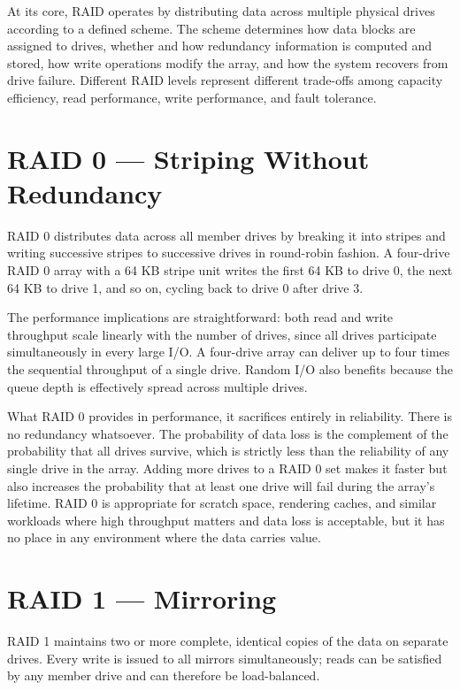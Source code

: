 At its core, RAID operates by distributing data across multiple physical drives according to a defined scheme. The scheme determines how data blocks are assigned to drives, whether and how redundancy information is computed and stored, how write operations modify the array, and how the system recovers from drive failure. Different RAID levels represent different trade-offs among capacity efficiency, read performance, write performance, and fault tolerance.

\section{RAID 0 --- Striping Without Redundancy}
RAID 0 distributes data across all member drives by breaking it into stripes and writing successive stripes to successive drives in round-robin fashion. A four-drive RAID 0 array with a 64 KB stripe unit writes the first 64 KB to drive 0, the next 64 KB to drive 1, and so on, cycling back to drive 0 after drive 3.

The performance implications are straightforward: both read and write throughput scale linearly with the number of drives, since all drives participate simultaneously in every large I/O. A four-drive array can deliver up to four times the sequential throughput of a single drive. Random I/O also benefits because the queue depth is effectively spread across multiple drives.

What RAID 0 provides in performance, it sacrifices entirely in reliability. There is no redundancy whatsoever. The probability of data loss is the complement of the probability that all drives survive, which is strictly less than the reliability of any single drive in the array. Adding more drives to a RAID 0 set makes it faster but also increases the probability that at least one drive will fail during the array's lifetime. RAID 0 is appropriate for scratch space, rendering caches, and similar workloads where high throughput matters and data loss is acceptable, but it has no place in any environment where the data carries value.

\section{RAID 1 --- Mirroring}
RAID 1 maintains two or more complete, identical copies of the data on separate drives. Every write is issued to all mirrors simultaneously; reads can be satisfied by any member drive and can therefore be load-balanced.

